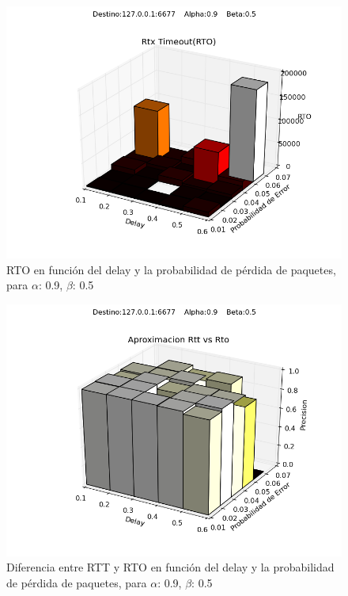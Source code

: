 \begin{figure}[H]
  \centering	
	\includegraphics[scale=0.5]{../analisis/graficos_tablas/graficos_en_funcion_de_delay_probaerror/0.9-0.5/rto.png}
  \caption{RTO en función del delay y la probabilidad de pérdida de paquetes, para $\alpha$: 0.9, $\beta$: 0.5}
	\label{fig:histo-src-sitiotrabajo}
\end{figure}

\begin{figure}[H]
  \centering	
	\includegraphics[scale=0.5]{../analisis/graficos_tablas/graficos_en_funcion_de_delay_probaerror/0.9-0.5/rtt_vs_rto.png}
  \caption{Diferencia entre RTT y RTO en funci\'on del delay y la probabilidad de pérdida de paquetes, para $\alpha$: 0.9, $\beta$: 0.5}
	\label{fig:histo-src-sitiotrabajo}
\end{figure}











